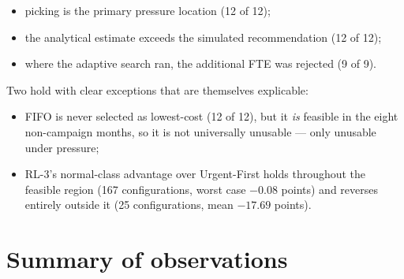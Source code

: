 \begin{itemize}
  \item picking is the primary pressure location (12 of 12);
  \item the analytical estimate exceeds the simulated recommendation (12 of 12);
  \item where the adaptive search ran, the additional FTE was rejected (9 of 9).
\end{itemize}

\noindent Two hold with clear exceptions that are themselves explicable:

\begin{itemize}
  \item FIFO is never selected as lowest-cost (12 of 12), but it \emph{is} feasible in the
        eight non-campaign months, so it is not universally unusable --- only unusable under
        pressure;
  \item RL-3's normal-class advantage over Urgent-First holds throughout the feasible region
        (167 configurations, worst case \(-0.08\) points) and reverses entirely outside it
        (25 configurations, mean \(-17.69\) points).
\end{itemize}

\section{Summary of observations}
\label{sec:res-summary}

